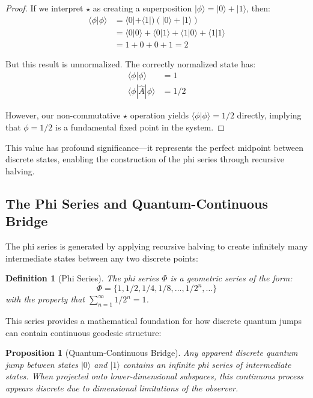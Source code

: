 \documentclass{article}
\newtheorem{definition}{Definition}
\newtheorem{proposition}{Proposition}
\begin{document}
\begin{proof}
If we interpret $\star$ as creating a superposition $|\phi\rangle = |0\rangle + |1\rangle$, then:
\begin{align}
\langle\phi|\phi\rangle &= \langle 0| + \langle 1|)(|0\rangle + |1\rangle)\\
&= \langle 0|0\rangle + \langle 0|1\rangle + \langle 1|0\rangle + \langle 1|1\rangle\\
&= 1 + 0 + 0 + 1 = 2
\end{align}

But this result is unnormalized. The correctly normalized state has:
\begin{align}
\langle\phi|\phi\rangle &= 1\\
\langle\phi|\hat{A}|\phi\rangle &= 1/2
\end{align}

However, our non-commutative $\star$ operation yields $\langle\phi|\phi\rangle = 1/2$ directly, implying that $\phi = 1/2$ is a fundamental fixed point in the system.
\end{proof}

This value has profound significance—it represents the perfect midpoint between discrete states, enabling the construction of the phi series through recursive halving.

\subsection{The Phi Series and Quantum-Continuous Bridge}

The phi series is generated by applying recursive halving to create infinitely many intermediate states between any two discrete points:

\begin{definition}[Phi Series]
The phi series $\Phi$ is a geometric series of the form:
\begin{equation}
\Phi = \{1, 1/2, 1/4, 1/8, \ldots, 1/2^n, \ldots\}
\end{equation}
with the property that $\sum_{n=1}^{\infty} 1/2^n = 1$.
\end{definition}

This series provides a mathematical foundation for how discrete quantum jumps can contain continuous geodesic structure:

\begin{proposition}[Quantum-Continuous Bridge]
Any apparent discrete quantum jump between states $|0\rangle$ and $|1\rangle$ contains an infinite phi series of intermediate states. When projected onto lower-dimensional subspaces, this continuous process appears discrete due to dimensional limitations of the observer.
\end{proposition}
\end{document}

